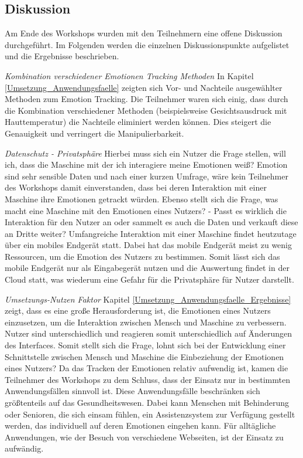 \subsection{Diskussion}
Am Ende des Workshops wurden mit den Teilnehmern eine offene Diskussion durchgeführt. Im Folgenden werden die einzelnen Diskussionspunkte aufgelistet und die Ergebnisse beschrieben.
\vspace{2mm}
\vspace{2mm}

\textit{Kombination verschiedener Emotionen Tracking Methoden} 
\newline
In Kapitel \ref{Umsetzung_Anwendungsfaelle} zeigten sich Vor- und Nachteile ausgewählter Methoden zum Emotion Tracking. Die Teilnehmer waren sich einig, dass durch die Kombination verschiedener Methoden (beispielsweise Gesichtsausdruck mit Hauttemperatur) die Nachteile eliminiert werden können. Dies steigert die Genauigkeit und verringert die Manipulierbarkeit.
\vspace{2mm}

\textit{Datenschutz - Privatsphäre} \newline
Hierbei muss sich ein Nutzer die Frage stellen, will ich, dass die Maschine mit der ich interagiere meine Emotionen weiß? Emotion sind sehr sensible Daten und nach einer kurzen Umfrage, wäre kein Teilnehmer des Workshops damit einverstanden, dass bei deren Interaktion mit einer Maschine ihre Emotionen getrackt würden. Ebenso stellt sich die Frage, was macht eine Maschine mit den Emotionen eines Nutzers? - Passt es wirklich die Interaktion für den Nutzer an oder sammelt es auch die Daten und verkauft diese an Dritte weiter? Umfangreiche Interaktion mit einer Maschine findet heutzutage über ein mobiles Endgerät statt. Dabei hat das mobile Endgerät meist zu wenig Ressourcen, um die Emotion des Nutzers zu bestimmen. Somit lässt sich das mobile Endgerät nur als Eingabegerät nutzen und die Auswertung findet in der Cloud statt, was wiederum eine Gefahr für die Privatsphäre für Nutzer darstellt.
\vspace{2mm}
\vspace{2mm}

\textit{Umsetzungs-Nutzen Faktor}\newline
Kapitel \ref{Umsetzung_Anwendungsfaelle_Ergebnisse} zeigt, dass es eine große Herausforderung ist, die Emotionen eines Nutzers einzusetzen, um die Interaktion zwischen Mensch und Maschine zu verbessern. Nutzer sind unterschiedlich und reagieren somit unterschiedlich auf Änderungen des Interfaces. Somit stellt sich die Frage, lohnt sich bei der Entwicklung einer Schnittstelle zwischen Mensch und Maschine die Einbeziehung der Emotionen eines Nutzers? Da das Tracken der Emotionen relativ aufwendig ist, kamen die Teilnehmer des Workshops zu dem Schluss, dass der Einsatz nur in bestimmten Anwendungsfällen sinnvoll ist. Diese Anwendungsfälle beschränken sich größtenteils auf das Gesundheitswesen. Dabei kann Menschen mit Behinderung oder Senioren, die sich einsam fühlen, ein Assistenzsystem zur Verfügung gestellt werden, das individuell auf deren Emotionen eingehen kann. Für alltägliche Anwendungen, wie der Besuch von verschiedene Webseiten, ist der Einsatz zu aufwändig.

